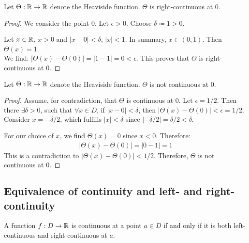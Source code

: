 \begin{theorem}
    Let $\Theta: \mathbb{R} \to \mathbb{R}$ denote the Heaviside function. $\Theta$ is right-continuous at $0$.
\end{theorem}

\begin{proof}
    We consider the point $0$. Let $\epsilon > 0$. Choose $\delta \coloneqq 1 > 0$.

    Let $x \in \mathbb{R}$, $x > 0$ and $|x - 0| < \delta$, \ie $|x| < 1$. In summary, $x\in (0,1)$. Then $\Theta(x) = 1$.\\
    We find: $|\Theta(x) - \Theta(0)| = |1 - 1| = 0 < \epsilon$. This proves that $\Theta$ is right-continuous at $0$.
\end{proof}


\begin{theorem}
    Let $\Theta: \mathbb{R} \to \mathbb{R}$ denote the Heaviside function. $\Theta$ is not continuous at $0$.
\end{theorem}

\begin{proof}
    Assume, for contradiction, that $\Theta$ is continuous at 0. Let $\epsilon = 1/2$. Then there $\exists \delta > 0$, such that $\forall x \in D$, if $|x - 0| < \delta$, then $|\Theta(x) - \Theta(0)| < \epsilon = 1/2$. Consider $\displaystyle x = -\delta/2$, which fulfills $|x| < \delta$ since $|- \delta / 2| = \delta / 2 < \delta$.

    For our choice of $x$, we find $\Theta(x) = 0$ since $x < 0$.
    Therefore:
    \begin{align*}
        |\Theta(x) - \Theta(0)| = |0 - 1| = 1
    \end{align*}
    This is a contradiction to $|\Theta(x) - \Theta(0)| < 1/2$. Therefore, $\Theta$ is not continuous at $0$.
\end{proof}




\pagebreak
\subsection{Equivalence of continuity and left- and right-continuity}

\begin{theorem}
    A function $f : D \to \mathbb{R}$ is continuous at a point $a \in D$ if and only if it is both left-continuous and right-continuous at $a$.
\end{theorem}

